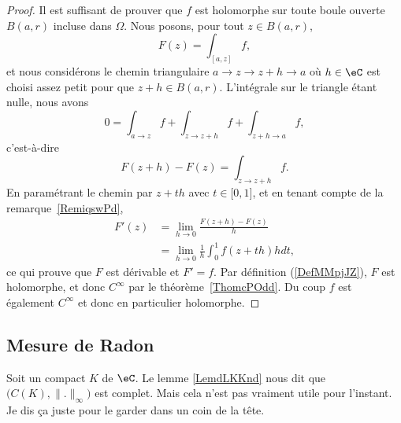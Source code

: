\begin{proof}
	Il est suffisant de prouver que \( f\) est holomorphe sur toute boule ouverte \( B(a,r)\) incluse dans \( \Omega\). Nous posons, pour tout \( z\in B(a,r)\),
	\begin{equation}
		F(z)=\int_{[a,z]}f,
	\end{equation}
	et nous considérons le chemin triangulaire \( a\to z\to z+h\to a\) où \( h\in \eC\) est choisi assez petit pour que \( z+h\in B(a,r)\). L'intégrale sur le triangle étant nulle, nous avons
	\begin{equation}
		0=\int_{a\to z}f+\int_{z\to z+h}f+\int_{z+h\to a}f,
	\end{equation}
	c'est-à-dire
	\begin{equation}
		F(z+h)-F(z)=\int_{z\to z+h}f.
	\end{equation}
	En paramétrant le chemin par \( z+th\) avec \( t\in\mathopen[ 0 , 1 \mathclose]\), et en tenant compte de la remarque~\ref{RemiqswPd},
	\begin{subequations}
		\begin{align}
			F'(z) & =\lim_{h\to 0} \frac{ F(z+h)-F(z) }{ h }        \\
			      & =\lim_{h\to 0} \frac{1}{ h }\int_0^1f(z+th)hdt,
		\end{align}
	\end{subequations}
	ce qui prouve que \( F\) est dérivable et \( F'=f\). Par définition (\ref{DefMMpjJZ}), \( F\) est holomorphe, et donc \( C^{\infty}\) par le théorème~\ref{ThomcPOdd}. Du coup \( f\) est également \(  C^{\infty}\) et donc en particulier holomorphe.
\end{proof}

\subsection{Mesure de Radon}

Soit un compact \( K\) de \( \eC\).  Le lemme \ref{LemdLKKnd} nous dit que \( \big( C(K),\| . \|_{\infty} \big) \) est complet. Mais cela n'est pas vraiment utile pour l'instant. Je dis ça juste pour le garder dans un coin de la tête.

